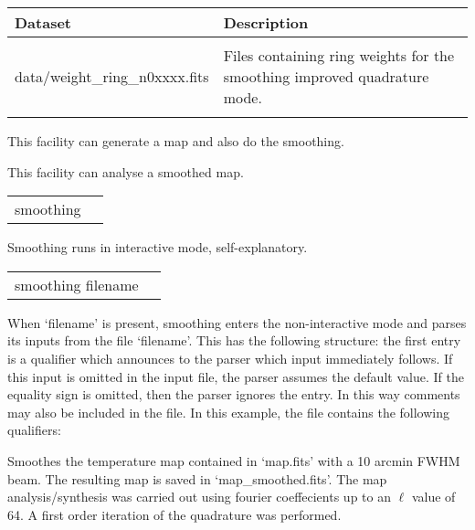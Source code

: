 \begin{datasets}
{
\begin{tabular}{p{0.3\hsize} p{0.35\hsize}} \hline  
  \textbf{Dataset} & \textbf{Description} \\ \hline
                   &                      \\ %
  data/weight\_ring\_n0xxxx.fits & Files containing ring weights
                   for the smoothing improved quadrature mode.\\ 
                   &                      \\ \hline %
\end{tabular}
} 
\end{datasets}

\begin{support}
  \begin{sulist}{} %
  \item[\htmlref{synfast}{fac:synfast}] This \healpix facility can generate a map and also do the smoothing.
  \item[\htmlref{anafast}{fac:anafast}] This \healpix facility can analyse a smoothed map.		
  \end{sulist}
\end{support}

\begin{examples}{1}
{
\begin{tabular}{ll} %
smoothing  \\
\end{tabular}
}
{
Smoothing runs in interactive mode, self-explanatory. 
}
\end{examples}

\vfill\newpage

\begin{examples}{2}
{
\begin{tabular}{ll} %
smoothing  filename \\
\end{tabular}
}
{When `filename' is present, smoothing enters the non-interactive mode and parses
its inputs from the file `filename'. This has the following
structure: the first entry is a qualifier which announces to the parser
which input immediately follows. If this input is omitted in the
input file, the parser assumes the default value.
If the equality sign is omitted, then the parser ignores the entry.
In this way comments may also be included in the file.
In this example, the file contains the following
qualifiers:\hfill\newline
{}
}

Smoothes the \healpix temperature map contained in `map.fits' with 
a 10 arcmin FWHM beam. The resulting map is saved 
in `map\_smoothed.fits'. The map analysis/synthesis was carried 
out using fourier coeffecients up to an $\ell$ value of 64. A first
order iteration of the quadrature was performed.

\end{examples}

